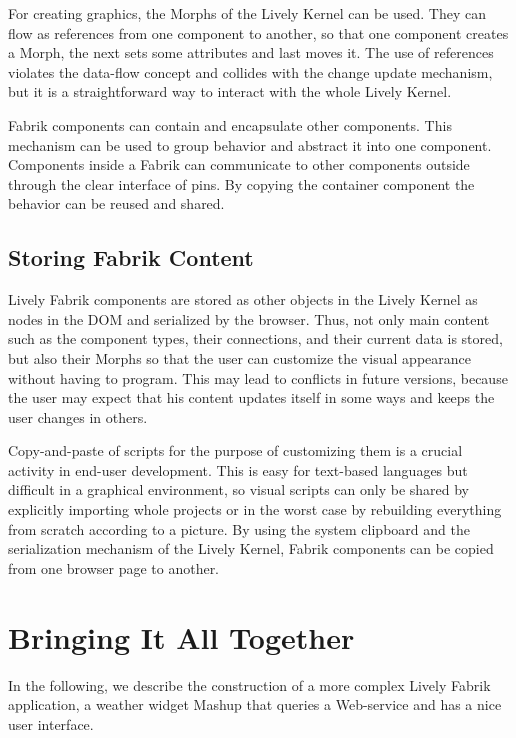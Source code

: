 \documentclass[pdftex, times, 10pt, twocolumn]{article}
\begin{document}
For creating graphics, the Morphs of the Lively Kernel can be used. They can flow as references from one component to another, so that one component creates a Morph, the next sets some attributes and last moves it. The use of references violates the data-flow concept and collides with the change update mechanism, but it is a straightforward way to interact with the whole Lively Kernel. 

Fabrik components can contain and encapsulate other components. This mechanism can be used to group behavior and abstract it into one component. Components inside a Fabrik can communicate to other components outside through the clear interface of pins. By copying the container component the behavior can be reused and shared. 



\subsection{Storing Fabrik Content}
Lively Fabrik components are stored as other objects in the Lively Kernel as nodes in the DOM and serialized by the browser. Thus, not only main content such as the component types, their connections, and their current data is stored, but also their Morphs so that the user can customize the visual appearance without having to program. This may lead to conflicts in future versions, because the user may expect that his content updates itself in some ways and keeps the user changes in others.  

Copy-and-paste of scripts for the purpose of customizing them is a crucial activity in end-user development.  This is easy for text-based languages but difficult in a graphical environment, so visual scripts can only be shared by explicitly importing whole projects or in the worst case by rebuilding everything from scratch according to a picture.  By using the system clipboard and the serialization mechanism of the Lively Kernel, Fabrik components can be copied from one browser page to another. 



\section{Bringing It All Together}
In the following, we describe the construction of a more complex Lively Fabrik application, a weather widget Mashup that queries a Web-service and has a nice user interface. 
\end{document}
